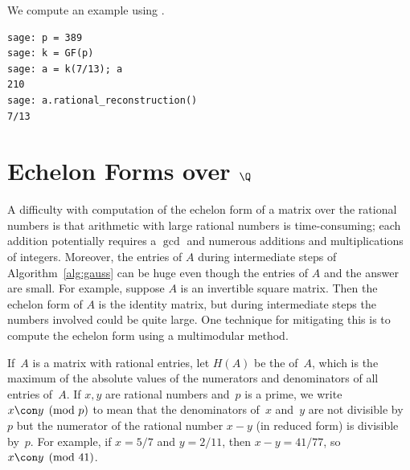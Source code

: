\begin{example}
We compute an example using \sage.
\begin{verbatim} 
sage: p = 389
sage: k = GF(p)
sage: a = k(7/13); a
210
sage: a.rational_reconstruction()
7/13
\end{verbatim}
\end{example}


\section{Echelon Forms over $\Q$}\label{sec:modularmethod}
A difficulty with computation of the echelon form of a matrix over the
rational numbers is that arithmetic with large rational numbers is
time-consuming; each addition potentially requires a $\gcd$
and numerous additions and multiplications of integers.  Moreover, the
entries of $A$ during intermediate steps of Algorithm~\ref{alg:gauss}
can be huge even though the entries of $A$ and the answer are small.
For example, suppose $A$ is an invertible square matrix.  Then the
echelon form of $A$ is the identity matrix, but during intermediate
steps the numbers involved could be quite large.  One technique for
mitigating this is to compute the echelon form using a
multimodular method.  



If~$A$ is a matrix with rational entries, let $H(A)$ be the
 of~$A$, which is the maximum of the absolute values of
the numerators and denominators of all entries of~$A$.  If $x,y$ are
rational numbers and~$p$ is a prime, we write $x\con y\pmod{p}$ to
mean that the denominators of~$x$ and~$y$ are not divisible by~$p$ but
the numerator of the rational number $x-y$ (in reduced form) is
divisible by~$p$.  For example, if $x=5/7$ and $y=2/11$, then
$x-y=41/77$, so $x\con y\pmod{41}$.


